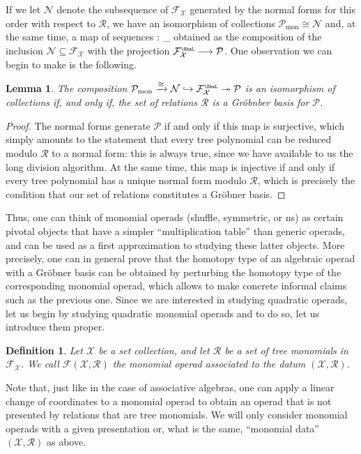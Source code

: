 \documentclass[fleqn, a4paper, twoside]{article}
\makeatletter
\newcommand{\Sha}{{\scaleobj{0.75}{\ShaL}}}
\newcommand{\0}{\langle 0\rangle}
\newcommand{\XX}{\mathcal{X}}
\newcommand{\RR}{\mathcal{R}}
\newcommand{\FF}{\mathcal{F}}
\let\[\@undefined
\DeclareRobustCommand{\[}{\begin{equation}}%
\let\]\@undefined
\DeclareRobustCommand{\]}{\end{equation}}%
\theoremstyle{mytheorem}
\newtheorem{lemma}[theorem]{Lemma}
\theoremstyle{introthm}
\theoremstyle{mydefinition}
\newtheorem{definition}[theorem]{Definition}
\theoremstyle{mydefinition2}
\theoremstyle{plain} %
\newcommand{\?}{\,?\,}
\newcommand{\PP}{{\mathcal{P}}}
\theoremstyle{mytheorem}
\theoremstyle{plain} %
\makeatother
\begin{document}
If we let $\mathcal N$ denote the subsequence of $\FF_\XX$ 
generated by the normal forms for this order with respect to $\RR$,
we have an isomorphism of collections $\PP_\mathrm{mon} \cong \mathcal N$
and, at the same time, a map of sequences
\[
\eta : \PP_ \longrightarrow \PP 
\]
obtained as the composition of the inclusion $\mathcal N\subseteq
\FF_\XX$ with the projection $\FF_\XX^\Sha\longrightarrow \PP$. One observation
we can begin to make is the following.

\begin{lemma} The composition $\PP_\mathrm{mon}\xrightarrow{\cong} \mathcal N \hookrightarrow 	\FF_\XX^\Sha \twoheadrightarrow \PP$
is an isomorphism of collections if, and only if, the set of relations 
$\RR$ is a Gr\"obnber basis for $\PP$. 
\end{lemma}

\begin{proof}
The normal forms generate $\PP$ if and only if this map is surjective, which simply
amounts to the statement that every tree polynomial can be reduced
modulo $\RR$ to a normal form: this is always true, since we have
available to us the long division algorithm. At the same time,
this map is injective if and only if every tree polynomial has a unique normal form
modulo $\RR$, which is precisely the condition that our set of
relations constitutes a Gr\"obner basis.
\end{proof}

Thus, one can think of monomial operads (shuffle, symmetric, or ns) 
as certain pivotal objects that have a simpler ``multiplication table''
than generic operads, and can be used as a first approximation to studying
these latter objects. More precisely, one can in general prove that the
homotopy type of an algebraic operad with a Gr\"obner basis can be obtained
by perturbing the homotopy type of the corresponding monomial operad,
which allows to make concrete informal claims such as the previous one.
Since we are interested in studying quadratic operads, 
let us begin by studying quadratic monomial operads and to do so,
let us introduce them proper.

\begin{definition}
Let $\XX$ be a set collection, and let $\RR$ be a set of tree monomials
in $\FF_\XX$. We call $\FF(\XX,\RR)$ the monomial operad associated to the
datum $(\XX,\RR)$. 
\end{definition}

Note that, just like in the case of associative algebras, one can apply
a linear change of coordinates to a monomial operad to obtain an operad
that is not presented by relations that are tree monomials. We will only
consider monomial operads with a given presentation or, what is the same,
``monomial data'' $(\XX,\RR)$ as above.
\end{document}
